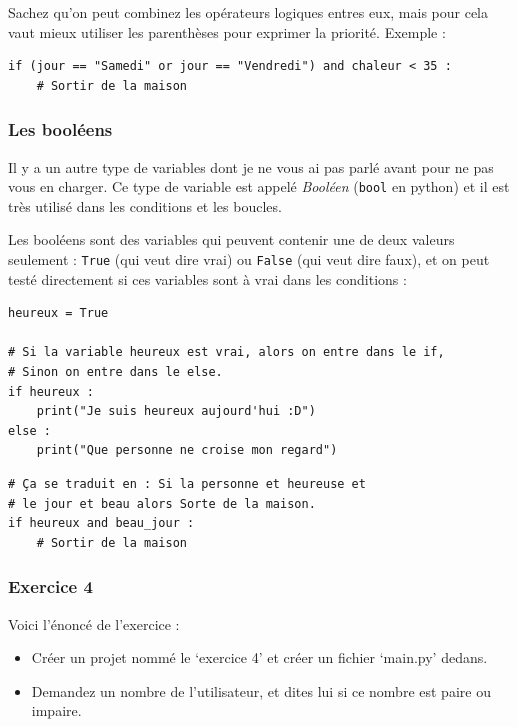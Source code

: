 \documentclass[12pt]{article}
\newcommand{\code}[1]{\colorbox{light-gray}{\texttt{#1}}}
\begin{document}
            Sachez qu'on peut combinez les opérateurs logiques entres eux, mais pour cela vaut mieux
            utiliser les parenthèses pour exprimer la priorité. Exemple :
            \begin{lstlisting}[style=code]
if (jour == "Samedi" or jour == "Vendredi") and chaleur < 35 :
    # Sortir de la maison
            \end{lstlisting}

        \subsubsection{Les booléens}
            Il y a un autre type de variables dont je ne vous ai pas parlé avant pour ne pas vous en charger.
            Ce type de variable est appelé \emph{Booléen} (\code{bool} en python) et il est très
            utilisé dans les conditions et les boucles.

            Les booléens sont des variables qui peuvent contenir une de deux valeurs seulement : \code{True}
            (qui veut dire vrai) ou \code{False} (qui veut dire faux), et on peut testé directement si ces
            variables sont à vrai dans les conditions :
            \begin{lstlisting}[style=code]
heureux = True

# Si la variable heureux est vrai, alors on entre dans le if,
# Sinon on entre dans le else.
if heureux :
    print("Je suis heureux aujourd'hui :D")
else :
    print("Que personne ne croise mon regard")
            \end{lstlisting}

            \begin{lstlisting}[style=code]
# Ça se traduit en : Si la personne et heureuse et
# le jour et beau alors Sorte de la maison.
if heureux and beau_jour :
    # Sortir de la maison
            \end{lstlisting}

        \subsubsection{Exercice 4}
            Voici l'énoncé de l'exercice :
            \begin{itemize}
                \item Créer un projet nommé le `exercice 4' et créer un fichier `main.py' dedans.
                \item Demandez un nombre de l'utilisateur, et dites lui si ce nombre est paire ou impaire.
            \end{itemize}
\end{document}

